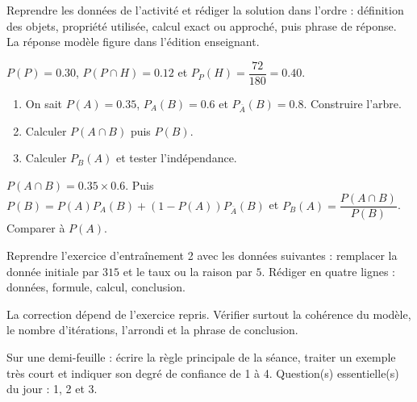 \begin{example}
Reprendre les données de l'activité et rédiger la solution dans l'ordre : définition des objets, propriété utilisée, calcul exact ou approché, puis phrase de réponse. La réponse modèle figure dans l'édition enseignant.
\end{example}
\begin{solution}$P(P)=\num{0,30}$, $P(P\cap H)=\num{0,12}$ et $P_P(H)=\dfrac{72}{180}=\num{0,40}$.\end{solution}

\begin{exercise}[essentiel]
\begin{enumerate}\item On sait $P(A)=\num{0,35}$, $P_A(B)=\num{0,6}$ et $P_{\overline A}(B)=\num{0,8}$. Construire l'arbre.\item Calculer $P(A\cap B)$ puis $P(B)$.\item Calculer $P_B(A)$ et tester l'indépendance.\end{enumerate}
\end{exercise}
\begin{solution}$P(A\cap B)=\num{0,35}\times\num{0,6}$. Puis $P(B)=P(A)P_A(B)+(1-P(A))P_{\overline A}(B)$ et $P_B(A)=\dfrac{P(A\cap B)}{P(B)}$. Comparer à $P(A)$.\end{solution}


\begin{homework}Reprendre l'exercice d'entraînement 2 avec les données suivantes : remplacer la donnée initiale par $315$ et le taux ou la raison par $5$. Rédiger en quatre lignes : données, formule, calcul, conclusion.\end{homework}
\begin{solution}La correction dépend de l'exercice repris. Vérifier surtout la cohérence du modèle, le nombre d'itérations, l'arrondi et la phrase de conclusion.\end{solution}

\begin{exitticket}[3 minutes]Sur une demi-feuille : écrire la règle principale de la séance, traiter un exemple très court et indiquer son degré de confiance de 1 à 4. Question(s) essentielle(s) du jour : 1, 2 et 3.\end{exitticket}

